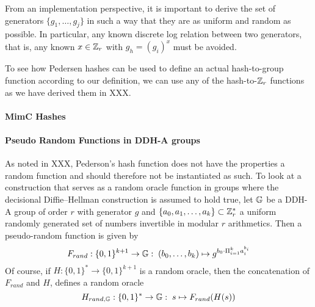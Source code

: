 From an implementation perspective, it is important to derive the set of generators $\{g_1,\ldots,g_j\}$ in such a way that they are as uniform and random as possible. In particular, any known discrete log relation between two generators, that is, any known $x\in \mathbb{Z}_r$ with $g_h = (g_i)^x$ must be avoided.

To see how Pedersen hashes can be used to define an actual hash-to-group function according to our definition, we can use any of the hash-to-$\mathbb{Z}_r$ functions as we have derived them in XXX. 

\paragraph{MimC Hashes}
\citep{cryptoeprint:2016:492}

\paragraph{Pseudo Random Functions in DDH-A groups}

As noted in XXX, Pederson's hash function does not have the properties a random function and should therefore not be instantiated as such. To look at a construction that serves as a random oracle function in groups where the decisional Diffie--Hellman construction is assumed to hold true, let $\mathbb{G}$ be a DDH-A group of order $r$ with generator $g$ and $\{a_0,a_1,\ldots,a_k\}\subset \mathbb{Z}_{r}^*$ a uniform randomly generated set of numbers invertible in modular $r$ arithmetics. Then a pseudo-random function is given by
\begin{equation}
F_{rand}: \{0,1\}^{k+1} \to \mathbb{G}:\; (b_0,\ldots,b_k)\mapsto g^{b_0\cdot \Pi_{i=1}^k a_i^{b_i}}
\end{equation}
Of course, if $H:\{0,1\}^*\to \{0,1\}^{k+1}$ is a random oracle, then the concatenation of $F_{rand}$ and $H$, defines a random oracle 
\begin{equation}
H_{rand,\mathbb{G}}:\{0,1\}^* \to \mathbb{G}:\; s\mapsto F_{rand}(H(s))
\end{equation}

